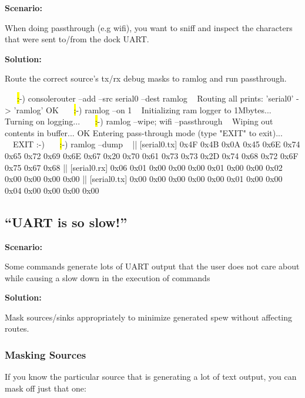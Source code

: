 \bfseries Scenario: \mdseries\par
When doing passthrough (e.g wifi), you want to sniff and inspect the characters that were sent to/from the dock UART. 

\bfseries Solution: \mdseries\par
Route the correct  source's tx/rx debug masks to ramlog and run passthrough. 

\begin{AnnotedLogFile}
~~~\hl:-) consolerouter --add --src serial0 --dest ramlog ~
Routing all prints: 'serial0' -> 'ramlog'
OK
~~~\hl:-) ramlog --on 1 ~
Initializing ram logger to 1Mbytes...
Turning on logging...
~~~\hl:-) ramlog --wipe; wifi --passthrough ~
Wiping out contents in buffer...
OK
Entering pass-through mode (type "EXIT" to exit)...
~~EXIT
:-)
~~~\hl:-) ramlog --dump ~
|| [serial0.tx] 0x4F 0x4B 0x0A 0x45 0x6E 0x74 0x65 0x72 0x69 0x6E 0x67 0x20 0x70 
       0x61 0x73 0x73 0x2D 0x74 0x68 0x72 0x6F 0x75 0x67 0x68 
|| [serial0.rx] 0x06 0x01 0x00 0x00 0x00 0x01 0x00 0x00 0x02 0x00 0x00 0x00 0x00
|| [serial0.tx] 0x00 0x00 0x00 0x00 0x00 0x01 0x00 0x00 0x04 0x00 0x00 0x00 0x00 
\end{AnnotedLogFile}


\subsection{``UART is so slow!''}

\bfseries Scenario: \mdseries\par 
Some commands generate lots of UART output that the user does not care about while causing a slow down in the execution of commands

\bfseries Solution: \mdseries\par 
Mask sources/sinks appropriately to minimize generated spew without affecting routes. 

\subsubsection{Masking Sources}

If you know the particular source that is generating a lot of text output, you can mask off just that one:

